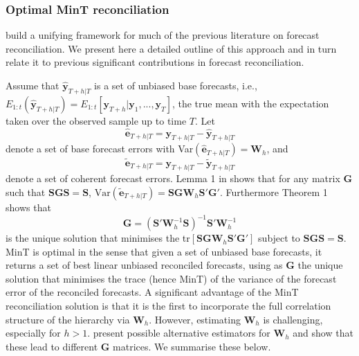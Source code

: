\documentclass[graybox]{svmult}
\begin{document}
\subsubsection{Optimal MinT reconciliation}

\cite{WicEtAl2019} build a unifying framework for much of the previous literature on forecast reconciliation. We present here a detailed outline of this approach and in turn relate it to previous significant contributions in forecast reconciliation.

Assume that $\hat{\bm{y}}_{T+h|T}$ is a set of unbiased base forecasts, i.e., $E_{1:t}(\hat{\bm{y}}_{T+h|T})= E_{1:t}[\bm{y}_{T+h}|\bm{y}_1,...,\bm{y}_T]$, the true mean with the expectation taken over the observed sample up to time $T$.
Let
\begin{equation}\label{eq:base errors}
\hat{\bm{e}}_{T+h|T} = \bm{y}_{T+h|T}-\hat{\bm{y}}_{T+h|T}
\end{equation}
denote a set of base forecast errors with Var$(\hat{\bm{e}}_{T+h|T})=\bm{W}_h$, and
\begin{equation*}
\tilde{\bm{e}}_{T+h|T} = \bm{y}_{T+h|T}-\tilde{\bm{y}}_{T+h|T}
\end{equation*} denote a set of coherent forecast errors. Lemma 1 in \cite{WicEtAl2019} shows that for any matrix $\bm{G}$ such that $\bm{S}\bm{G}\bm{S}=\bm{S}$, $\text{Var}(\tilde{\bm{e}}_{T+h|T})=\bm{S}\bm{G}\bm{W}_h\bm{S}'\bm{G}'
$. Furthermore Theorem 1 shows that
\begin{equation} \label{eq:MinT}
\bm{G} = (\bm{S}'{\bm{W}}^{-1}_h\bm{S})^{-1}\bm{S}'{\bm{W}}^{-1}_h
\end{equation}
is the unique solution that minimises the tr$[\bm{S}\bm{G}\bm{W}_h\bm{S}'\bm{G}']$ subject to $\bm{S}\bm{G}\bm{S}=\bm{S}$. MinT is optimal in the sense that given a set of unbiased base forecasts, it returns a set of best linear unbiased reconciled forecasts, using as $\bm{G}$ the unique solution that minimises the trace (hence MinT) of the variance of the forecast error of the reconciled forecasts. A significant advantage of the MinT reconciliation solution is that it is the first to incorporate the full correlation structure of the hierarchy via ${\bm{W}}_{h}$. However, estimating ${\bm{W}}_{h}$ is challenging, especially for $h>1$. \citet{WicEtAl2019} present possible alternative estimators for ${\bm{W}}_{h}$ and show that these lead to different $\bm{G}$ matrices. We summarise these below.
\end{document}
